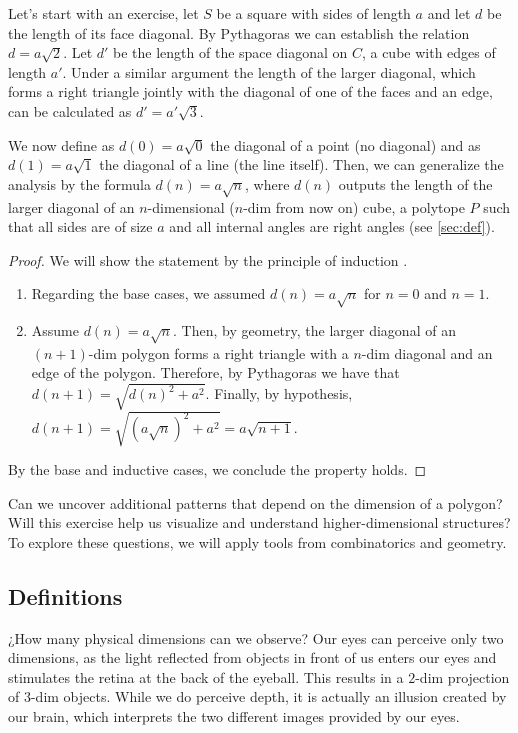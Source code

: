 \documentclass{article}
\begin{document}
	Let's start with an exercise, let $S$ be a square \cite{euclid} with sides of length $a$ and let $d$ be the length of its face diagonal. By Pythagoras \cite{euclid} we can establish the relation $d=a\sqrt{2}$. Let $d'$ be the length of the space diagonal on $C$, a cube \cite{euclid} with edges of length $a'$. Under a similar argument the length of the larger diagonal, which forms a right triangle jointly with the diagonal of one of the faces and an edge, can be calculated as $d'=a'\sqrt{3}$.
	
	We now define as $d(0) = a\sqrt{0}$ the diagonal of a point (no diagonal) and as $d(1) = a\sqrt{1}$ the diagonal of a line (the line itself). Then, we can generalize the analysis by the formula $d(n) = a\sqrt{n}$, where $d(n)$ outputs the length of the larger diagonal of an $n$-dimensional ($n$-dim from now on) cube, a polytope $P$ such that all sides are of size $a$ and all internal angles are right angles \cite{coxeter1973regular} (see \autoref{sec:def}).

	\begin{proof}
		We will show the statement by the principle of induction \cite{rosen2011discrete}.
		\begin{enumerate}
			\item Regarding the base cases, we assumed $d(n)=a\sqrt{n}$ for $n=0$ and $n=1$.
			
			\item Assume $d(n)=a\sqrt{n}$. Then, by geometry, the larger diagonal of an $(n+1)$-dim polygon forms a right triangle with a $n$-dim diagonal and an edge of the polygon. Therefore, by Pythagoras we have that $d(n+1) = \sqrt{d(n)^2 + a^2}$. Finally, by hypothesis, $d(n+1) = \sqrt{(a\sqrt{n})^2 + a^2} = a \sqrt{n + 1}$.
		\end{enumerate}
		By the base and inductive cases, we conclude the property holds.
	\end{proof}

	Can we uncover additional patterns that depend on the dimension of a polygon? Will this exercise help us visualize and understand higher-dimensional structures? To explore these questions, we will apply tools from combinatorics and geometry.

	
	\subsection{Definitions \label{sec:def}}
	
	¿How many physical dimensions can we observe? Our eyes can perceive only two dimensions, as the light reflected from objects in front of us enters our eyes and stimulates the retina at the back of the eyeball. This results in a $2$-dim projection of $3$-dim objects. While we do perceive depth, it is actually an illusion created by our brain, which interprets the two different images provided by our eyes.
	
\end{document}
